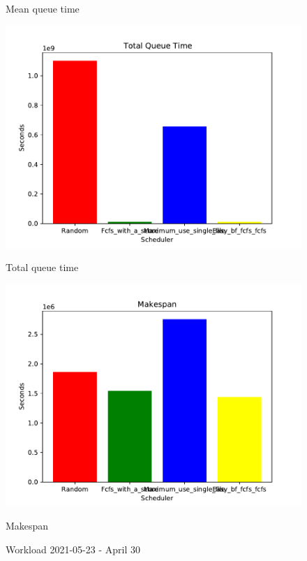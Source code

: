 \documentclass[a4paper]{article}
\begin{document}
\begin{figure}[H]
\begin{minipage}[b]{0.5\linewidth}
    \caption{Mean queue time} 
    \vspace{4ex}
  \end{minipage} 
  \begin{minipage}[b]{0.5\linewidth}
    \centering
    \includegraphics[width=1.11\linewidth]{MBSS/plot/2021-05-23_Total_queue_time.pdf} 
    \caption{Total queue time} 
    \vspace{4ex}
  \end{minipage}%
  \begin{minipage}[b]{0.5\linewidth}
    \centering
    \includegraphics[width=1.11\linewidth]{MBSS/plot/2021-05-23_Makespan.pdf} 
    \caption{Makespan} 
    \vspace{4ex}
  \end{minipage} 
  \caption{Workload 2021-05-23 - April 30}
\end{figure}
\end{document}
